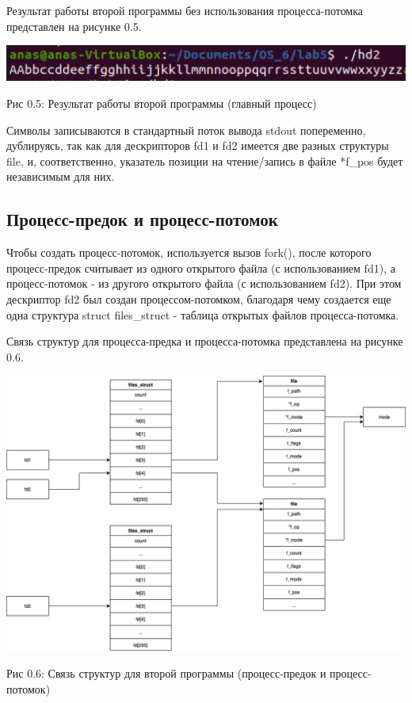 \documentclass[12pt]{report}
\begin{document}
Результат работы второй программы без использования процесса-потомка представлен на рисунке 0.5.

\begin{center}
		\includegraphics[scale=0.6]{pics/Res2.png}
		
			Рис 0.5: Результат работы второй программы (главный процесс)
\end{center}

Символы записываются в стандартный поток вывода stdout попеременно, дублируясь, так как для дескрипторов fd1 и fd2 имеется две разных структуры file, и, соответственно, указатель позиции на чтение/запись в файле *f\_pos будет независимым для них.

\subsection{Процесс-предок и процесс-потомок}

Чтобы создать процесс-потомок, используется вызов fork(), после которого процесс-предок считывает из одного открытого файла (с использованием fd1), а процесс-потомок - из другого открытого файла (с использованием fd2). При этом дескриптор fd2 был создан процессом-потомком, благодаря чему создается еще одна структура struct files\_struct - таблица открытых файлов процесса-потомка.

Связь структур для процесса-предка и процесса-потомка представлена на рисунке 0.6.

\begin{center}
		\includegraphics[scale=0.45]{pics/proc2_fork_2.0.png}
		
			Рис 0.6: Связь структур для второй программы (процесс-предок и процесс-потомок)
\end{center}
\end{document}
